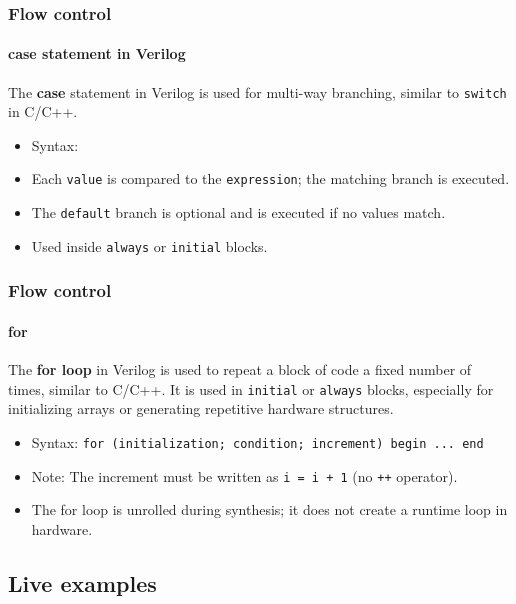 \documentclass{beamer}
\begin{document}
\begin{frame}\frametitle{Flow control}\framesubtitle{case statement in Verilog}
The \textbf{case} statement in Verilog is used for multi-way branching, similar to \texttt{switch} in C/C++.

\begin{itemize}
	\item Syntax:
\end{itemize}



\begin{itemize}
	\item Each \texttt{value} is compared to the \texttt{expression}; the matching branch is executed.
	\item The \texttt{default} branch is optional and is executed if no values match.
	\item Used inside \texttt{always} or \texttt{initial} blocks.
\end{itemize}
\end{frame}

\begin{frame}\frametitle{Flow control}\framesubtitle{for}

The \textbf{for loop} in Verilog is used to repeat 
a block of code a fixed number of times, 
similar to C/C++. It is
used in \texttt{initial} or \texttt{always} blocks,
especially for initializing arrays or generating 
repetitive hardware structures.

\begin{itemize}
	\item Syntax: \texttt{for (initialization; condition; increment) begin ... end}
\end{itemize}



\begin{itemize}
	\item Note: The increment must be written as \texttt{i = i + 1} (no \texttt{++} operator).
	\item The for loop is unrolled during synthesis; it does not create a runtime loop in hardware.
\end{itemize}
\end{frame}

\subsection{Live examples}
\end{document}
